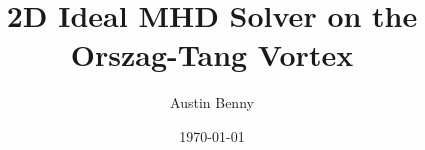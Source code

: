 \documentclass[aspectratio=43]{beamer}
\title[2D Ideal MHD]{2D Ideal MHD Solver on the Orszag-Tang Vortex}
\author{Austin Benny}
\institute{}
\date{\today}
\begin{document}
\begin{frame}
  \titlepage
\end{frame}


\end{document}
